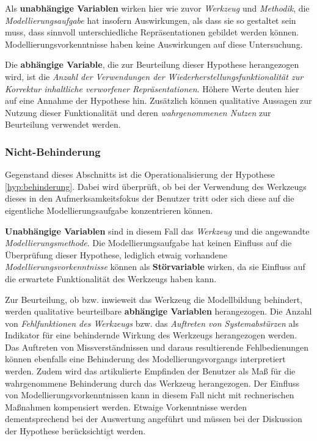 Als \textbf{unabhängige Variablen} wirken hier wie zuvor \emph{Werkzeug} und \emph{Methodik}, die \emph{Modellierungsaufgabe} hat insofern Auswirkungen, als dass sie so gestaltet sein muss, dass sinnvoll unterschiedliche Repräsentationen gebildet werden können. Modellierungsvorkenntnisse haben keine Auswirkungen auf diese Untersuchung.

Die \textbf{abhängige Variable}, die zur Beurteilung dieser Hypothese herangezogen wird, ist die \emph{Anzahl der Verwendungen der Wiederherstellungsfunktionalität zur Korrektur inhaltliche verworfener Repräsentationen}. Höhere Werte deuten hier auf eine Annahme der Hypothese hin. Zusätzlich können qualitative Aussagen zur Nutzung dieser Funktionalität und deren \emph{wahrgenommenen Nutzen} zur Beurteilung verwendet werden. 


\subsubsection{Nicht-Behinderung} %
\label{ssub:nicht_behinderung}

Gegenstand dieses Abschnitts ist die Operationalisierung der Hypothese \ref{hyp:behinderung}. Dabei wird überprüft, ob bei der Verwendung des Werkzeugs dieses in den Aufmerksamkeitsfokus der Benutzer tritt oder sich diese auf die eigentliche Modellierungsaufgabe konzentrieren können. 

\textbf{Unabhängige Variablen} sind in diesem Fall das \emph{Werkzeug} und die angewandte \emph{Modellierungsmethode}. Die Modellierungsaufgabe hat keinen Einfluss auf die Überprüfung dieser Hypothese, lediglich etwaig vorhandene \emph{Modellierungsvorkenntnisse} können als \textbf{Störvariable} wirken, da sie Einfluss auf die erwartete Funktionalität des Werkzeugs haben kann.

Zur Beurteilung, ob bzw. inwieweit das Werkzeug die Modellbildung behindert, werden qualitative beurteilbare \textbf{abhängige Variablen} herangezogen.  Die Anzahl von \emph{Fehlfunktionen des Werkzeugs} bzw. das \emph{Auftreten von Systemabstürzen} als Indikator für eine behindernde Wirkung des Werkzeugs herangezogen werden. Das Auftreten von Missverständnissen und daraus resultierende Fehlbedienungen können ebenfalls eine Behinderung des Modellierungsvorgangs interpretiert werden. Zudem wird das artikulierte Empfinden der Benutzer als Maß für die wahrgenommene Behinderung durch das Werkzeug herangezogen. Der Einfluss von Modellierungsvorkenntnissen kann in diesem Fall nicht mit rechnerischen Maßnahmen kompensiert werden. Etwaige Vorkenntnisse werden dementsprechend bei der Auswertung angeführt und müssen bei der Diskussion der Hypothese berücksichtigt werden.

